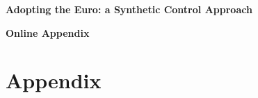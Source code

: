 \documentclass[12pt]{article}
\begin{document}
\begin{appendices}

\setcounter{page}{1}
\setcounter{table}{0}
\setcounter{figure}{0}
\renewcommand{\thepage}{\roman{page}}
\renewcommand{\thetable}{\Alph{section}.\arabic{table}}
\renewcommand{\thefigure}{\Alph{section}.\arabic{figure}}
\renewcommand{\theEquation}{\Alph{section}.\arabic{Equation}}

\begin{titlepage}

\begin{center}
\textbf{\huge{Adopting the Euro: a Synthetic Control Approach}}\\

\vspace{4em}

\textbf{\huge{Online Appendix}}\\

\end{center}

\thispagestyle{empty}

\end{titlepage}


\section{Appendix}

\end{appendices}
\end{document}
